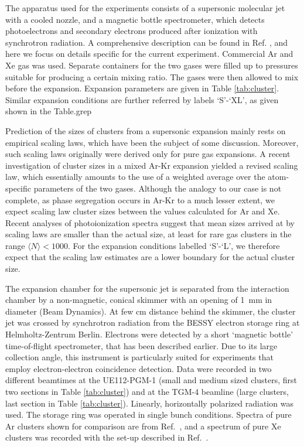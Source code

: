 %
%
The apparatus used for the experiments consists of a supersonic molecular jet with a cooled nozzle, and a magnetic bottle spectrometer, which detects photoelectrons and secondary electrons produced after ionization with synchrotron radiation.\cite{arion} 
A comprehensive description can be found in Ref. , and here we focus on details specific for the current experiment. Commercial Ar and Xe gas was used. 
Separate containers for the two gases were filled up to pressures suitable for producing a certain mixing ratio. The gases were then allowed to mix before the expansion. 
Expansion parameters are given in Table \ref{tab:cluster}. 
Similar expansion conditions are further referred by labels `S'-`XL', as given shown in the Table.grep 

Prediction of the sizes of clusters from a supersonic expansion mainly rests on empirical scaling laws,\cite{hagena1981} which have been the subject of some discussion.
Moreover, such scaling laws originally were derived only for pure gas expansions.
A recent investigation of cluster sizes in a mixed Ar-Kr expansion yielded a revised scaling law, which essentially amounts to the use of a weighted average over the atom-specific parameters of the two gases.\cite{danylchenko2015} 
Although the analogy to our case is not complete, as phase segregation occurs in Ar-Kr to a much lesser extent,\cite{Vach_1999,lundwall_arkr} we expect scaling law cluster sizes between the values calculated for Ar and Xe.
Recent analyses of photoionization spectra suggest that mean sizes arrived at by scaling laws are smaller than the actual size, at least for rare gas clusters in the range $\langle N\rangle < 1000$.\cite{bergersen,hergenhahnprb,foerstel_arg2_2011}
For the expansion conditions labelled `S'-`L', we therefore expect that the scaling law estimates are a lower boundary for the actual cluster size.

The expansion chamber for the supersonic jet is separated from the interaction chamber by a non-magnetic, conical skimmer with an opening of 1~mm in diameter (Beam Dynamics). 
At few cm distance behind the skimmer, the cluster jet was crossed by synchrotron radiation from the BESSY electron storage ring at Helmholtz-Zentrum Berlin. 
Electrons were detected by a short `magnetic bottle' time-of-flight spectrometer, that has been described earlier.\cite{mucke_review}
Due to its large collection angle, this instrument is particularly suited for experiments that employ electron-electron coincidence detection.
Data were recorded in two different beamtimes at the UE112-PGM-1 (small and medium sized clusters, first two sections in Table \ref{tab:cluster}) and at the TGM-4 beamline (large clusters, last section in Table \ref{tab:cluster}). 
Linearly, horizontally polarized radiation was used. 
The storage ring was operated in single bunch conditions.
Spectra of pure Ar clusters shown for comparison are from Ref.\ , and a spectrum of pure Xe clusters was recorded with the set-up described in Ref.\ .

